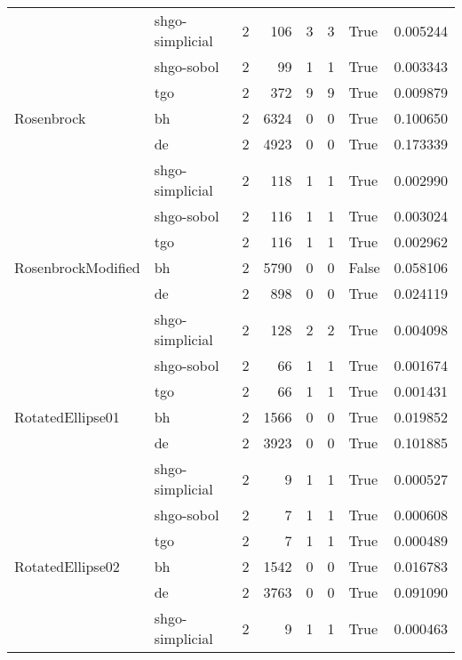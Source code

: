 \begin{longtable}{llrrrrlr}
         & shgo-simplicial &     2 &      106 &      3 &       3 &    True &    0.005244 \\
         & shgo-sobol &     2 &       99 &      1 &       1 &    True &    0.003343 \\
         & tgo &     2 &      372 &      9 &       9 &    True &    0.009879 \\
Rosenbrock & bh &     2 &     6324 &      0 &       0 &    True &    0.100650 \\
         & de &     2 &     4923 &      0 &       0 &    True &    0.173339 \\
         & shgo-simplicial &     2 &      118 &      1 &       1 &    True &    0.002990 \\
         & shgo-sobol &     2 &      116 &      1 &       1 &    True &    0.003024 \\
         & tgo &     2 &      116 &      1 &       1 &    True &    0.002962 \\
RosenbrockModified & bh &     2 &     5790 &      0 &       0 &   False &    0.058106 \\
         & de &     2 &      898 &      0 &       0 &    True &    0.024119 \\
         & shgo-simplicial &     2 &      128 &      2 &       2 &    True &    0.004098 \\
         & shgo-sobol &     2 &       66 &      1 &       1 &    True &    0.001674 \\
         & tgo &     2 &       66 &      1 &       1 &    True &    0.001431 \\
RotatedEllipse01 & bh &     2 &     1566 &      0 &       0 &    True &    0.019852 \\
         & de &     2 &     3923 &      0 &       0 &    True &    0.101885 \\
         & shgo-simplicial &     2 &        9 &      1 &       1 &    True &    0.000527 \\
         & shgo-sobol &     2 &        7 &      1 &       1 &    True &    0.000608 \\
         & tgo &     2 &        7 &      1 &       1 &    True &    0.000489 \\
RotatedEllipse02 & bh &     2 &     1542 &      0 &       0 &    True &    0.016783 \\
         & de &     2 &     3763 &      0 &       0 &    True &    0.091090 \\
         & shgo-simplicial &     2 &        9 &      1 &       1 &    True &    0.000463 \\

\end{longtable}
